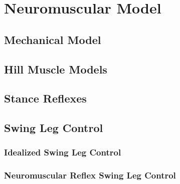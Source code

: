 \chapter{Neuromuscular Model}\label{sec:neuro_model}

\section{Mechanical Model}
\section{Hill Muscle Models}
\section{Stance Reflexes}
\section{Swing Leg Control}
\subsection{Idealized Swing Leg Control}
\subsection{Neuromuscular Reflex Swing Leg Control}

